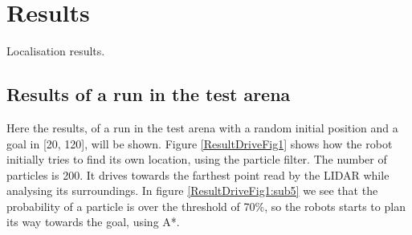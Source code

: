 \section{Results}
Localisation results.\\

\subsection{Results of a run in the test arena}
Here the results, of a run in the test arena with a random initial position and a goal in [20, 120], will be shown.
Figure \ref{ResultDriveFig1} shows how the robot initially tries to find its own location, using the particle filter. The number of particles is 200. It drives towards the farthest point read by the LIDAR while analysing its surroundings. In figure \ref{ResultDriveFig1:sub5} we see that the probability of a particle is over the threshold of 70\%, so the robots starts to plan its way towards the goal, using A*. 
